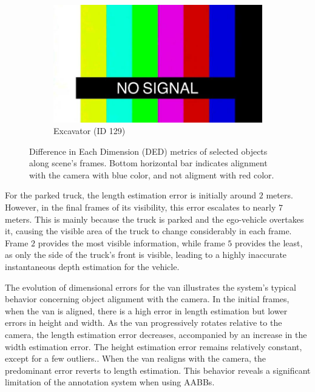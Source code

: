 \begin{figure}[h!]
    \hfill
    \begin{subfigure}[b]{0.32\textwidth}
        \includegraphics[width=\textwidth]{images/shared/no_signal.jpg}
        \caption{Excavator (ID 129)}
        \label{fig:scene_ded_cases_c}
    \end{subfigure}
    \caption{Difference in Each Dimension (DED) metrics of selected objects along scene's frames. Bottom horizontal bar indicates alignment with the camera with blue color, and not aligment with red color.}
    \label{fig:scene_ded_cases}
\end{figure}

For the parked truck, the length estimation error is initially around $2$ meters. However, in the final frames of its visibility, this error escalates to nearly $7$ meters. This is mainly because the truck is parked and the ego-vehicle overtakes it, causing the visible area of the truck to change considerably in each frame. Frame $2$ provides the most visible information, while frame $5$ provides the least, as only the side of the truck's front is visible, leading to a highly inaccurate instantaneous depth estimation for the vehicle.

The evolution of dimensional errors for the van illustrates the system's typical behavior concerning object alignment with the camera. In the initial frames, when the van is aligned, there is a high error in length estimation but lower errors in height and width. As the van progressively rotates relative to the camera, the length estimation error decreases, accompanied by an increase in the width estimation error. The height estimation error remains relatively constant, except for a few outliers.. When the van realigns with the camera, the predominant error reverts to length estimation. This behavior reveals a significant limitation of the annotation system when using \acp{AABB}.

